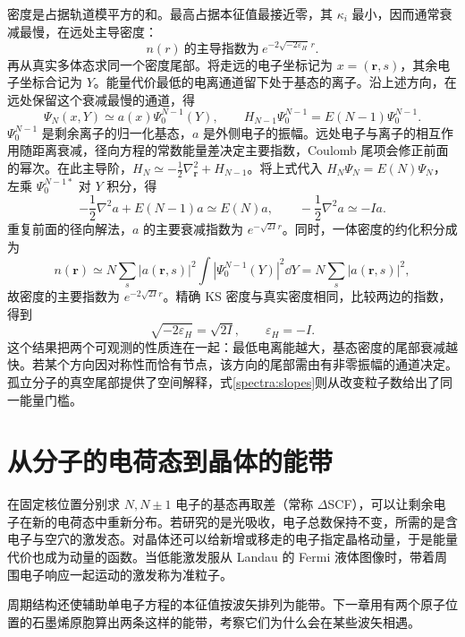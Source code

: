密度是占据轨道模平方的和。最高占据本征值最接近零，其 $\kappa_i$ 最小，因而通常衰减最慢，在远处主导密度：
\begin{equation}
n(r)\ \text{的主导指数为}\ e^{-2\sqrt{-2\varepsilon_H}\,r}.
\end{equation}
再从真实多体态求同一个密度尾部。将走远的电子坐标记为 $x=(\bm r,s)$，其余电子坐标合记为 $Y$。能量代价最低的电离通道留下处于基态的离子。沿上述方向，在远处保留这个衰减最慢的通道，得
\begin{equation}
\Psi_N(x,Y)\simeq a(x)\Psi_0^{N-1}(Y),\qquad
H_{N-1}\Psi_0^{N-1}=E(N-1)\Psi_0^{N-1}.
\end{equation}
$\Psi_0^{N-1}$ 是剩余离子的归一化基态，$a$ 是外侧电子的振幅。远处电子与离子的相互作用随距离衰减，径向方程的常数能量差决定主要指数，Coulomb 尾项会修正前面的幂次。在此主导阶，$H_N\simeq-\tfrac12\nabla_{\bm r}^2+H_{N-1}$。将上式代入 $H_N\Psi_N=E(N)\Psi_N$，左乘 $\Psi_0^{N-1*}$ 对 $Y$ 积分，得
\begin{equation}
-\frac12\nabla^2a+E(N-1)a\simeq E(N)a,
\qquad -\frac12\nabla^2a\simeq-Ia.
\end{equation}
重复前面的径向解法，$a$ 的主要衰减指数为 $e^{-\sqrt{2I}r}$。同时，一体密度的约化积分成为
\begin{equation}
n(\bm r)\simeq N\sum_s|a(\bm r,s)|^2\int|\Psi_0^{N-1}(Y)|^2\dd Y
=N\sum_s|a(\bm r,s)|^2,
\end{equation}
故密度的主要指数为 $e^{-2\sqrt{2I}r}$。精确 KS 密度与真实密度相同，比较两边的指数，得到
\begin{equation}
\sqrt{-2\varepsilon_H}=\sqrt{2I},\qquad \varepsilon_H=-I.
\end{equation}
这个结果把两个可观测的性质连在一起：最低电离能越大，基态密度的尾部衰减越快。若某个方向因对称性而恰有节点，该方向的尾部需由有非零振幅的通道决定。孤立分子的真空尾部提供了空间解释，式\eqref{spectra:slopes}则从改变粒子数给出了同一能量门槛。

\section{从分子的电荷态到晶体的能带}
在固定核位置分别求 $N,N\pm1$ 电子的基态再取差（常称 $\Delta$SCF），可以让剩余电子在新的电荷态中重新分布。若研究的是光吸收，电子总数保持不变，所需的是含电子与空穴的激发态。对晶体还可以给新增或移走的电子指定晶格动量，于是能量代价也成为动量的函数。当低能激发服从 Landau 的 Fermi 液体图像时，带着周围电子响应一起运动的激发称为准粒子。

周期结构还使辅助单电子方程的本征值按波矢排列为能带。下一章用有两个原子位置的石墨烯原胞算出两条这样的能带，考察它们为什么会在某些波矢相遇。
